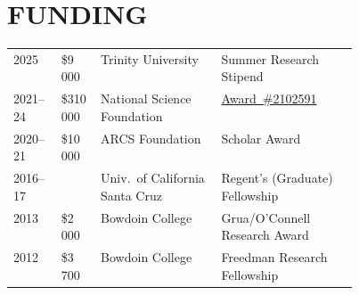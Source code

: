 \section{FUNDING}
\begin{tabular}{@{}p{.1\linewidth} p{0.1\linewidth} p{0.35\linewidth} @{}p{.4\linewidth}} 
    2025 & \$9\,000 & Trinity University & Summer Research Stipend\\
    2021--24 & \$310\,000 & National Science Foundation & \href{https://www.nsf.gov/awardsearch/showAward?AWD_ID=2102591}{Award~\#2102591}\\
    2020--21 & \$10\,000 & ARCS Foundation & Scholar Award \\
    2016--17 &  & Univ.~of California Santa Cruz  & Regent's (Graduate) Fellowship \\
    2013 & \$2\,000 & Bowdoin College & Grua/O'Connell Research Award  \\ 
    2012 & \$3\,700 & Bowdoin College & Freedman Research Fellowship \\
\end{tabular}